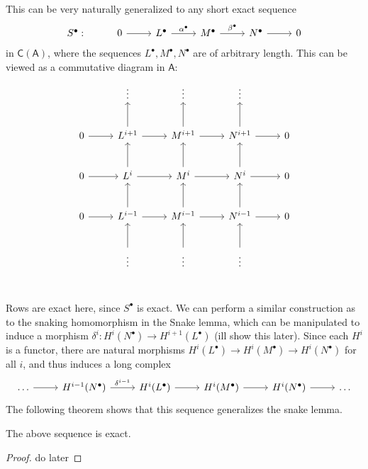 This can be very naturally generalized to any short exact sequence
\[\begin{tikzcd}[row sep = 2.5em, column sep = 2.5em]
	S^\bullet :&0\ar[r]&L^\bullet \ar[r, "\alpha^\bullet "]&M^\bullet \ar[r, "\beta ^\bullet "]&N^\bullet \ar[r]&0
\end{tikzcd}\]
in $\mathsf{C} (\mathsf{A} )$, where the sequences $L^\bullet ,M^\bullet ,N^\bullet $ are of arbitrary length. This can be viewed as a commutative diagram in $\mathsf{A} $:
\[\begin{tikzcd}[row sep = 2.5em, column sep = 2.5em]
	&\vdots&\vdots&\vdots\\
	0\ar[r]&L^{i+1} \ar[u]\ar[r]&M^{i+1} \ar[r]\ar[u]&N^{i+1} \ar[r]\ar[u]&0\\
	0\ar[r]&L^{i} \ar[u]\ar[r]&M^{i} \ar[r]\ar[u]&N^{i} \ar[r]\ar[u]&0\\
	0\ar[r]&L^{i-1} \ar[u]\ar[r]&M^{i-1} \ar[r]\ar[u]&N^{i-1} \ar[r]\ar[u]&0\\
	       &\vdots\ar[u]&\vdots\ar[u]&\vdots\ar[u]\\
\end{tikzcd}\]
Rows are exact here, since $S^\bullet $ is exact. We can perform a similar construction as to the snaking homomorphism in the Snake lemma, which can be manipulated to induce a morphism $\delta ^i : H^i(N^\bullet ) \to H^{i+1} (L^\bullet )$ (ill show this later). Since each $H^i$ is a functor, there are natural morphisms $H^i(L^\bullet )\to H^i(M^\bullet )\to H^i(N^\bullet )$ for all $i$, and thus induces a long complex
\[\begin{tikzcd}[row sep = 2.5em, column sep = 2.5em]
	\ldots \ar[r]&H^{i-1} (N^\bullet )\ar[r, "\delta^{i-1} "]&H^i(L^\bullet )\ar[r]&H^i(M^\bullet )\ar[r]&H^i(N^\bullet )\ar[r]&\ldots
\end{tikzcd}\]
The following theorem shows that this sequence generalizes the snake lemma.
\begin{theorem}\label{thm:9.3.1}
	The above sequence is exact.
\end{theorem}
\begin{proof}
	do later
\end{proof}

